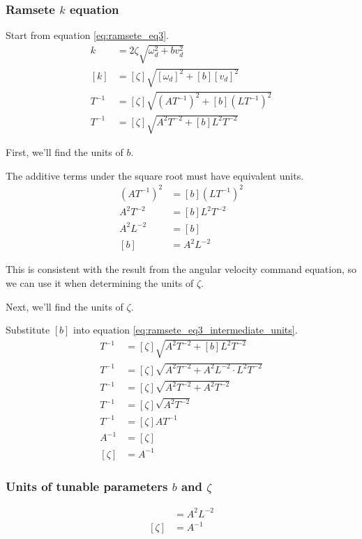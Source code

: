 \subsubsection{Ramsete $k$ equation}

Start from equation \eqref{eq:ramsete_eq3}.
\begin{align}
  k &= 2\zeta \sqrt{\omega_d^{2} + bv_d^{2}} \nonumber \\
  [k] &= [\zeta] \sqrt{[\omega_d]^{2} + [b][v_d]^{2}} \nonumber \\
  T^{-1} &= [\zeta] \sqrt{(A T^{-1})^{2} + [b] (L T^{-1})^{2}} \nonumber \\
  T^{-1} &= [\zeta] \sqrt{A^{2} T^{-2} + [b] L^{2} T^{-2}}
    \label{eq:ramsete_eq3_intermediate_units}
\end{align}

First, we'll find the units of $b$.

The additive terms under the square root must have equivalent units.
\begin{align*}
  (A T^{-1})^{2} &= [b] (L T^{-1})^{2} \\
  A^{2} T^{-2} &= [b] L^{2} T^{-2} \\
  A^{2} L^{-2} &= [b] \\
  [b] &= A^{2} L^{-2}
\end{align*}

This is consistent with the result from the angular velocity command equation,
so we can use it when determining the units of $\zeta$.

Next, we'll find the units of $\zeta$.

Substitute $[b]$ into equation \eqref{eq:ramsete_eq3_intermediate_units}.
\begin{align*}
  T^{-1} &= [\zeta] \sqrt{A^{2} T^{-2} + [b] L^{2} T^{-2}} \\
  T^{-1} &= [\zeta] \sqrt{A^{2} T^{-2} + A^{2} L^{-2} \cdot L^{2} T^{-2}} \\
  T^{-1} &= [\zeta] \sqrt{A^{2} T^{-2} + A^{2} T^{-2}} \\
  T^{-1} &= [\zeta] \sqrt{A^{2} T^{-2}} \\
  T^{-1} &= [\zeta] A T^{-1} \\
  A^{-1} &= [\zeta] \\
  [\zeta] &= A^{-1}
\end{align*}

\subsubsection{Units of tunable parameters $b$ and $\zeta$}
\begin{align}
  [b] &= A^{2} L^{-2} \\
  [\zeta] &= A^{-1}
\end{align}
